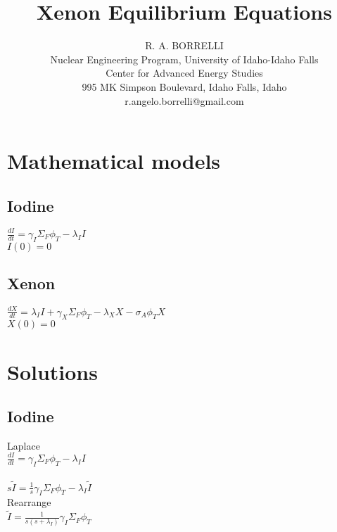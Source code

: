 \documentclass[11pt,a4paper]{article}
\begin{document}
\begin{titlepage}
            \title{Xenon Equilibrium Equations}
            \author{
                R. A. BORRELLI \\
                Nuclear Engineering Program, University of Idaho-Idaho Falls \\
                Center for Advanced Energy Studies \\
                995 MK Simpson Boulevard, Idaho Falls, Idaho \\
                r.angelo.borrelli@gmail.com
            }
\clearpage %
\maketitle
\thispagestyle{empty} %
\end{titlepage}

\section{Mathematical models}
\subsection{Iodine}
$\frac{dI}{dt}=\gamma_I \Sigma_F \phi_T-\lambda_I I$ \\
$I(0)=0$

\subsection{Xenon}
$\frac{dX}{dt}=\lambda_I I + \gamma_X \Sigma_F \phi_T - \lambda_X X - \sigma_A \phi_T X$ \\
$X(0)=0$

\section{Solutions}
\subsection{Iodine}
Laplace \\
$\frac{dI}{dt}=\gamma_I \Sigma_F \phi_T-\lambda_I I$ \\ \\
$s\tilde{I}=\frac{1}{s}\gamma_I\Sigma_F\phi_T-\lambda_I\tilde{I}$ \\

\noindent Rearrange \\
$\tilde{I}=\frac{1}{s(s+\lambda_I)}\gamma_I\Sigma_F\phi_T$ \\
\end{document}
